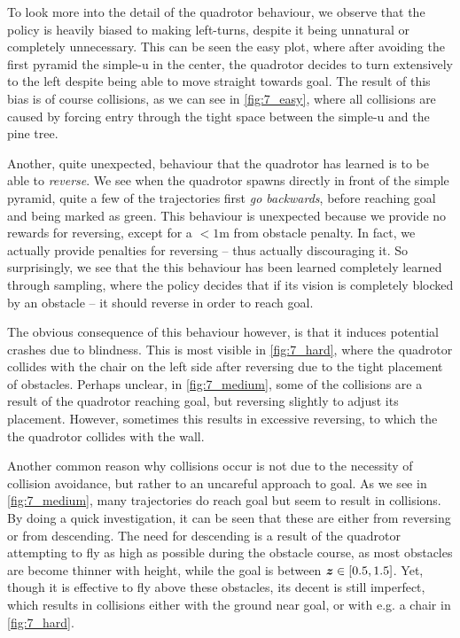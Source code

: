 To look more into the detail of the quadrotor behaviour, we observe that the policy is heavily biased to making left-turns, despite it being unnatural or completely unnecessary. This can be seen the easy plot, where after avoiding the first pyramid the simple-u in the center, the quadrotor decides to turn extensively to the left despite being able to move straight towards goal. The result of this bias is of course collisions, as we can see in \cref{fig:7_easy}, where all collisions are caused by forcing entry through the tight space between the simple-u and the pine tree.

Another, quite unexpected, behaviour that the quadrotor has learned is to be able to \textit{reverse}. We see when the quadrotor spawns directly in front of the simple pyramid, quite a few of the trajectories first \textit{go backwards}, before reaching goal and being marked as green. This behaviour is unexpected because we provide no rewards for reversing, except for a $<1$m from obstacle penalty. In fact, we actually provide penalties for reversing -- thus actually discouraging it. So surprisingly, we see that the this behaviour has been learned completely learned through sampling, where the policy decides that if its vision is completely blocked by an obstacle -- it should reverse in order to reach goal.

The obvious consequence of this behaviour however, is that it induces potential crashes due to blindness. This is most visible in \cref{fig:7_hard}, where the quadrotor collides with the chair on the left side after reversing due to the tight placement of obstacles.
Perhaps unclear, in \cref{fig:7_medium}, some of the collisions are a result of the quadrotor reaching goal, but reversing slightly to adjust its placement. However, sometimes this results in excessive reversing, to which the the quadrotor collides with the wall. 

Another common reason why collisions occur is not due to the necessity of collision avoidance, but rather to an uncareful approach to goal. As we see in \cref{fig:7_medium}, many trajectories do reach goal but seem to result in collisions. By doing a quick investigation, it can be seen that these are either from reversing or from descending.
The need for descending is a result of the quadrotor attempting to fly as high as possible during the obstacle course, as most obstacles are become thinner with height, while the goal is between ${\boldsymbol{z}} \in [0.5, 1.5]$. Yet, though it is effective to fly above these obstacles, its decent is still imperfect, which results in collisions either with the ground near goal, or with e.g. a chair in \cref{fig:7_hard}. 

